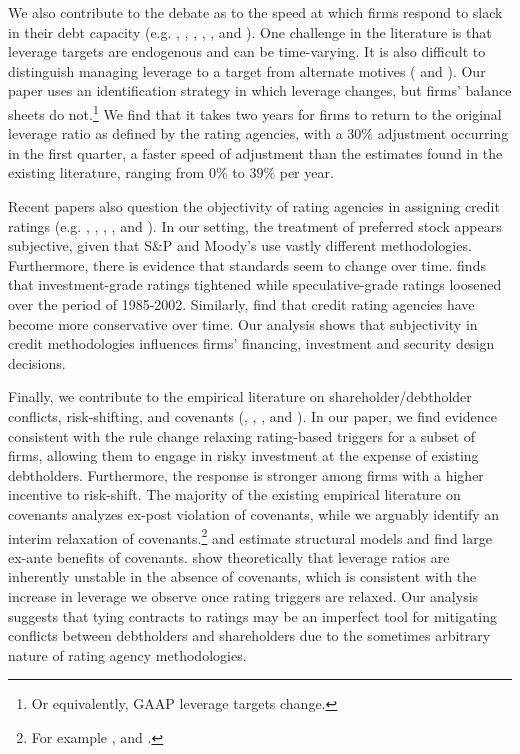 \documentclass[a4paper, 12pt]{article}
\begin{document}
We also contribute to the debate as to the speed at which firms respond to slack in their debt capacity  (e.g. \citealp{fama2002testing}, \citealp{baker2002market}, \citealp{welch2004capital}, \citealp{leary2005firms}, \citealp{flannery2006partial}, \citealp{alti2006persistent} and \citealp{kayhan2007firms}). One challenge in the literature is that leverage targets are endogenous and can be time-varying. It is also difficult to distinguish managing leverage to a target from alternate motives (\citealp{iliev2010reconciling} and \citealp{graham2011review}). Our paper uses an identification strategy in which leverage changes, but firms' balance sheets do not.\footnote{Or equivalently, GAAP leverage targets change.} We find that it takes two years for firms to return to the original leverage ratio as defined by the rating agencies, with a $30\%$ adjustment occurring in the first quarter, a faster speed of adjustment than the estimates found in the existing literature, ranging from $0\%$ to $39\%$ per year.

Recent papers also question the objectivity of rating agencies in assigning credit ratings (e.g. \citealp{griffin2012did}, \citealp{fracassi2016does}, \citealp{cornaggia2016revolving}, \cite{kempf2018partisan}, and \citealp{wang2021rating}). In our setting, the treatment of preferred stock appears subjective, given that S\&P and Moody's use vastly different methodologies. Furthermore, there is evidence that standards seem to change over time. \cite{alp2013structural} finds that investment-grade ratings tightened while speculative-grade ratings loosened over the period of 1985-2002. Similarly, \cite{baghai2014have} find that credit rating agencies have become more conservative over time. Our analysis shows that subjectivity in credit methodologies influences firms' financing, investment and security design decisions.


Finally, we contribute to the empirical literature on shareholder/debtholder conflicts, risk-shifting, and covenants (\citealp{eisdorfer2008empirical}, \citealp{gilje2016firms}, \citealp{rauh2008risk}, and \citealp{gormley2011growing}). In our paper, we find evidence consistent with the rule change relaxing rating-based triggers for a subset of firms, allowing them to engage in risky investment at the expense of existing debtholders. Furthermore, the response is stronger among firms with a higher incentive to risk-shift. The majority of the existing empirical literature on covenants analyzes ex-post violation of covenants, while we arguably identify an interim relaxation of covenants.\footnote{For example \cite{chava2008does}, \cite{roberts2009renegotiation} and \cite{nini2009creditor}.} \cite{matvos2013estimating} and \cite{green2018corporate} estimate structural models and find large ex-ante benefits of covenants. \cite{admati2018leverage} show theoretically that leverage ratios are inherently unstable in the absence of covenants, which is consistent with the increase in leverage we observe once rating triggers are relaxed. Our analysis suggests that tying contracts to ratings may be an imperfect tool for mitigating conflicts between debtholders and shareholders due to the sometimes arbitrary nature of rating agency methodologies.
\end{document}
